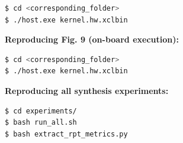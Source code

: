 \documentclass[conference]{IEEEtran}
\begin{document}
\begin{lstlisting}[language=bash]
$ cd <corresponding_folder>
$ ./host.exe kernel.hw.xclbin
\end{lstlisting}

\textbf{Reproducing Fig. 9 (on-board execution):}
\begin{lstlisting}[language=bash]
$ cd <corresponding_folder>
$ ./host.exe kernel.hw.xclbin
\end{lstlisting}

\textbf{Reproducing all synthesis experiments:}
\begin{lstlisting}[language=bash]
$ cd experiments/
$ bash run_all.sh
$ bash extract_rpt_metrics.py
\end{lstlisting}



\end{document}
